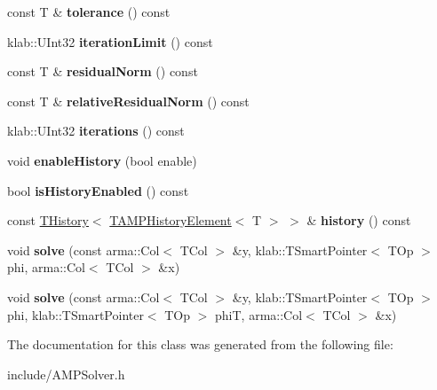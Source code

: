 \begin{DoxyCompactItemize}
\item 
const T \& {\bfseries tolerance} () const \hypertarget{classkl1p_1_1TAMPSolver_a9b6ed85a78ab1987d63976b1599e7bc6}{}\label{classkl1p_1_1TAMPSolver_a9b6ed85a78ab1987d63976b1599e7bc6}

\item 
klab\+::\+U\+Int32 {\bfseries iteration\+Limit} () const \hypertarget{classkl1p_1_1TAMPSolver_aa5679f298008e150cf90fdf3780907c8}{}\label{classkl1p_1_1TAMPSolver_aa5679f298008e150cf90fdf3780907c8}

\item 
const T \& {\bfseries residual\+Norm} () const \hypertarget{classkl1p_1_1TAMPSolver_a4889a7dffbee0f4aac7a2c28730db173}{}\label{classkl1p_1_1TAMPSolver_a4889a7dffbee0f4aac7a2c28730db173}

\item 
const T \& {\bfseries relative\+Residual\+Norm} () const \hypertarget{classkl1p_1_1TAMPSolver_af7f8d281285484a0732a827438f50eb6}{}\label{classkl1p_1_1TAMPSolver_af7f8d281285484a0732a827438f50eb6}

\item 
klab\+::\+U\+Int32 {\bfseries iterations} () const \hypertarget{classkl1p_1_1TAMPSolver_ab8efcd660edc5f18364ded2c1cbe1d49}{}\label{classkl1p_1_1TAMPSolver_ab8efcd660edc5f18364ded2c1cbe1d49}

\item 
void {\bfseries enable\+History} (bool enable)\hypertarget{classkl1p_1_1TAMPSolver_adee60c9920d0108d0143f7d7a7eb1cf1}{}\label{classkl1p_1_1TAMPSolver_adee60c9920d0108d0143f7d7a7eb1cf1}

\item 
bool {\bfseries is\+History\+Enabled} () const \hypertarget{classkl1p_1_1TAMPSolver_ab0ebae5b2b394b051a779d95f82a7b45}{}\label{classkl1p_1_1TAMPSolver_ab0ebae5b2b394b051a779d95f82a7b45}

\item 
const \hyperlink{classkl1p_1_1THistory}{T\+History}$<$ \hyperlink{classkl1p_1_1TAMPHistoryElement}{T\+A\+M\+P\+History\+Element}$<$ T $>$ $>$ \& {\bfseries history} () const \hypertarget{classkl1p_1_1TAMPSolver_ac26f3cbf3b4d21f8446016ecd32de314}{}\label{classkl1p_1_1TAMPSolver_ac26f3cbf3b4d21f8446016ecd32de314}

\item 
void {\bfseries solve} (const arma\+::\+Col$<$ T\+Col $>$ \&y, klab\+::\+T\+Smart\+Pointer$<$ T\+Op $>$ phi, arma\+::\+Col$<$ T\+Col $>$ \&x)\hypertarget{classkl1p_1_1TAMPSolver_a83cab6fbf7939183d1070fd8c98f2024}{}\label{classkl1p_1_1TAMPSolver_a83cab6fbf7939183d1070fd8c98f2024}

\item 
void {\bfseries solve} (const arma\+::\+Col$<$ T\+Col $>$ \&y, klab\+::\+T\+Smart\+Pointer$<$ T\+Op $>$ phi, klab\+::\+T\+Smart\+Pointer$<$ T\+Op $>$ phiT, arma\+::\+Col$<$ T\+Col $>$ \&x)\hypertarget{classkl1p_1_1TAMPSolver_a98617efc42da15d10cc3a8f6d1af6d02}{}\label{classkl1p_1_1TAMPSolver_a98617efc42da15d10cc3a8f6d1af6d02}

\end{DoxyCompactItemize}


The documentation for this class was generated from the following file\+:\begin{DoxyCompactItemize}
\item 
include/A\+M\+P\+Solver.\+h\end{DoxyCompactItemize}
